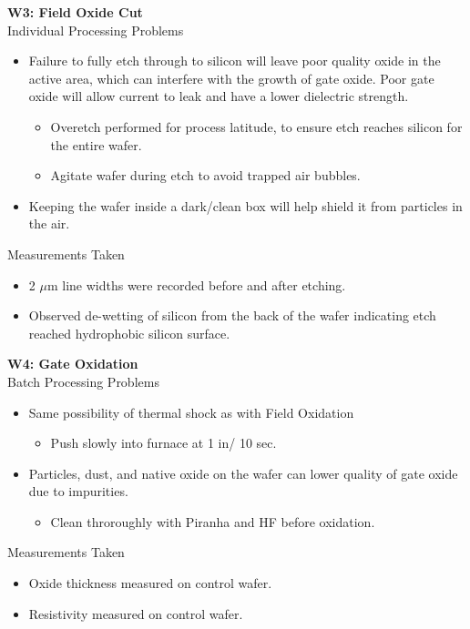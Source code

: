 \documentclass{article}
\begin{document}
\textbf{W3: Field Oxide Cut} \\
Individual Processing Problems
\begin{itemize}
\item Failure to fully etch through to silicon will leave poor quality oxide in the active area, which can interfere with the growth of gate oxide. Poor gate oxide will allow current to leak and have a lower dielectric strength.
	\begin{itemize}
	\item Overetch performed for process latitude, to ensure etch reaches silicon for the entire wafer.
	\item  Agitate wafer during etch to avoid trapped air bubbles.
	\end{itemize}
\item Keeping the wafer inside a dark/clean box will help shield it from particles in the air.
\end{itemize}
Measurements Taken
\begin{itemize}
\item 2 $\mu$m line widths were recorded before and after etching.
\item Observed de-wetting of silicon from the back of the wafer indicating etch reached hydrophobic silicon surface.
\end{itemize}

\textbf{W4: Gate Oxidation} \\
Batch Processing Problems
\begin{itemize}
\item Same possibility of thermal shock as with Field Oxidation
	\begin{itemize}
	\item Push slowly into furnace at 1 in/ 10 sec.
	\end{itemize}
\item Particles, dust, and native oxide on the wafer can lower quality of gate oxide due to impurities. 
	\begin{itemize}
	\item Clean throroughly with Piranha and HF before oxidation.
	\end{itemize}
\end{itemize}
Measurements Taken
\begin{itemize}
\item Oxide thickness measured on control wafer.
\item Resistivity measured on control wafer.
\end{itemize}
\end{document}

